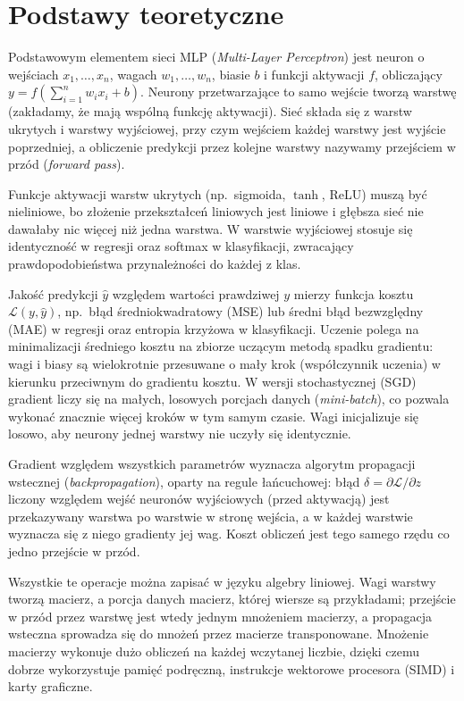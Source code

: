 \documentclass{article}
\begin{document}
\section{Podstawy teoretyczne}
\label{sec:teoria}

Podstawowym elementem sieci MLP (\emph{Multi-Layer Perceptron}) jest neuron o wejściach
$x_1, \ldots, x_n$, wagach $w_1, \ldots, w_n$, biasie $b$ i funkcji aktywacji $f$, obliczający
$y = f(\sum_{i=1}^{n} w_i x_i + b)$. Neurony przetwarzające to samo wejście tworzą warstwę
(zakładamy, że mają wspólną funkcję aktywacji). Sieć składa się z warstw ukrytych i warstwy
wyjściowej, przy czym wejściem każdej warstwy jest wyjście poprzedniej, a obliczenie predykcji przez
kolejne warstwy nazywamy przejściem w przód (\emph{forward pass}).

Funkcje aktywacji warstw ukrytych (np.\ sigmoida, $\tanh$, ReLU) muszą być nieliniowe, bo złożenie
przekształceń liniowych jest liniowe i głębsza sieć nie dawałaby nic więcej niż jedna warstwa.
W warstwie wyjściowej stosuje się identyczność w regresji oraz softmax w klasyfikacji, zwracający
prawdopodobieństwa przynależności do każdej z klas.

Jakość predykcji $\hat{y}$ względem wartości prawdziwej $y$ mierzy funkcja kosztu
$\mathcal{L}(y, \hat{y})$, np.\ błąd średniokwadratowy (MSE) lub średni błąd bezwzględny (MAE)
w regresji oraz entropia krzyżowa w klasyfikacji. Uczenie polega na minimalizacji średniego kosztu
na zbiorze uczącym metodą spadku gradientu: wagi i biasy są wielokrotnie przesuwane o mały krok
(współczynnik uczenia) w kierunku przeciwnym do gradientu kosztu. W wersji stochastycznej (SGD)
gradient liczy się na małych, losowych porcjach danych (\emph{mini-batch}), co pozwala wykonać
znacznie więcej kroków w tym samym czasie. Wagi inicjalizuje się losowo, aby neurony jednej warstwy
nie uczyły się identycznie.

Gradient względem wszystkich parametrów wyznacza algorytm propagacji wstecznej
(\emph{backpropagation}), oparty na regule łańcuchowej: błąd $\delta = \partial\mathcal{L}/\partial z$
liczony względem wejść neuronów wyjściowych (przed aktywacją) jest przekazywany warstwa po warstwie
w stronę wejścia, a w każdej warstwie wyznacza się z niego gradienty jej wag. Koszt obliczeń jest
tego samego rzędu co jedno przejście w przód.

Wszystkie te operacje można zapisać w języku algebry liniowej. Wagi warstwy tworzą macierz, a porcja
danych macierz, której wiersze są przykładami; przejście w przód przez warstwę jest wtedy jednym
mnożeniem macierzy, a propagacja wsteczna sprowadza się do mnożeń przez macierze transponowane.
Mnożenie macierzy wykonuje dużo obliczeń na każdej wczytanej liczbie, dzięki czemu dobrze
wykorzystuje pamięć podręczną, instrukcje wektorowe procesora (SIMD) i karty graficzne.
\end{document}
